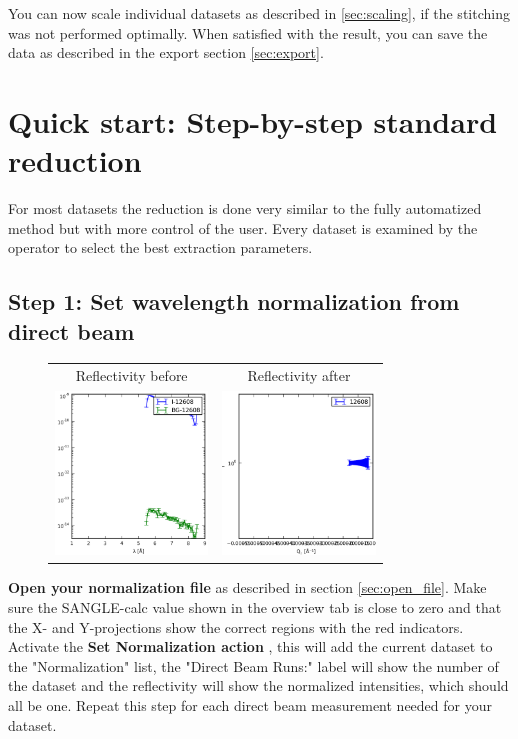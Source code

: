   
  You can now scale individual datasets as described in \ref{sec:scaling}, if the stitching was not performed optimally.
  When satisfied with the result, you can save the data as described in the export section \ref{sec:export}.
  

\section{Quick start: Step-by-step standard reduction}
\label{sec:quick_start}
  For most datasets the reduction is done very similar to the fully automatized method but with more control of the user.
  Every dataset is examined by the operator to select the best extraction parameters.
  
  \subsection{Step 1: Set wavelength normalization from direct beam}
    \begin{figure}
    \begin{tabular}{cc}
        Reflectivity before & Reflectivity after \\
      \includegraphics[width=115pt]{screenshots/normalize3.png} & \includegraphics[width=115pt]{screenshots/normalize_after.png}
    \end{tabular}     
    \end{figure}
  
        \textbf{Open your normalization file} as described in section \ref{sec:open_file}. 
      Make sure the SANGLE-calc value shown in the overview tab is close to zero and that the X- and Y-projections show the correct regions with the red indicators.
      Activate the \textbf{Set Normalization action} , this will add the current dataset to the "Normalization" list, the "Direct Beam Runs:" label will show the number of the dataset and the reflectivity will show the normalized intensities, which should all be one.
      Repeat this step for each direct beam measurement needed for your dataset.

